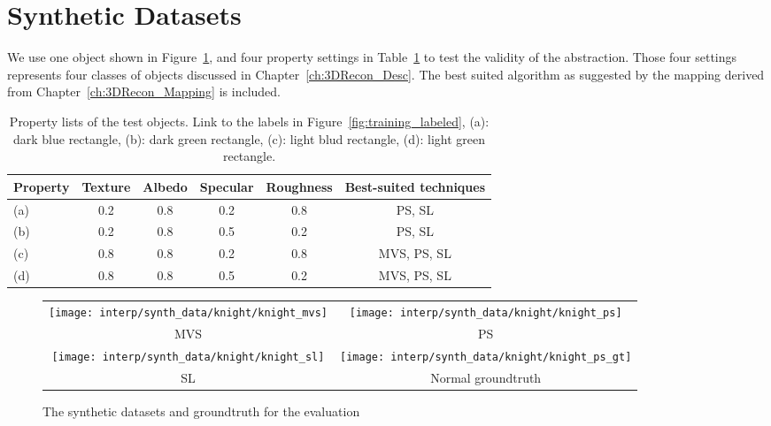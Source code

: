 \section{Synthetic Datasets}
We use one object shown in Figure~\ref{fig:synth_data}, and four property settings in Table~\ref{tab:prop_list_synth_data} to test the validity of the abstraction. Those four settings represents four classes of objects discussed in Chapter~\ref{ch:3DRecon_Desc}. The best suited algorithm as suggested by the mapping derived from Chapter~\ref{ch:3DRecon_Mapping} is included.
\begin{table}[h]
  \centering
  \begin{tabular}{l*{5}{c}}
  \hline
  \textbf{Property} & Texture & Albedo & Specular & Roughness & Best-suited techniques\\
  \hline
  (a) & 0.2 & 0.8 & 0.2 & 0.8 & PS, SL\\
  (b) & 0.2 & 0.8 & 0.5 & 0.2 & PS, SL\\
  (c) & 0.8 & 0.8 & 0.2 & 0.8 & MVS, PS, SL\\
  (d) & 0.8 & 0.8 & 0.5 & 0.2 & MVS, PS, SL\\
  \hline
  \end{tabular}
  \caption{Property lists of the test objects. Link to the labels in Figure~\ref{fig:training_labeled}, (a): dark blue rectangle, (b): dark green rectangle, (c): light blud rectangle, (d): light green rectangle.}
  \label{tab:prop_list_synth_data}
\end{table}

\begin{figure}[h!]
\centering
\begin{tabular}{cc}
  \texttt{[image: interp/synth\_data/knight/knight\_mvs]}&
  \texttt{[image: interp/synth\_data/knight/knight\_ps]}\\
  MVS & PS\\
  \texttt{[image: interp/synth\_data/knight/knight\_sl]}&
  \texttt{[image: interp/synth\_data/knight/knight\_ps\_gt]}\\
  SL & Normal groundtruth\\
\end{tabular}
\caption{The synthetic datasets and groundtruth for the evaluation}
\label{fig:synth_data}
\end{figure}

